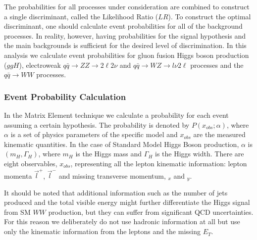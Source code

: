 The probabilities for all processes under consideration are combined 
to construct a single discriminant, called the Likelihood Ratio ($LR$).  
To construct the optimal discriminant, one should calculate 
event probabilities for all of the background processes. In reality, however, having 
probabilities for the signal hypothesis and the main backgrounds is sufficient for the 
desired level of discrimination. In this analysis we calculate event probabilities 
for gluon fusion Higgs boson production ($ggH$), electroweak $q\bar{q}\rightarrow ZZ\to 2\ell2\nu$ 
and $q\bar{q}\rightarrow WZ\to l\nu2\ell$ processes and the $q\bar{q}\rightarrow WW$ processes. 


\subsubsection{Event Probability Calculation}

In the Matrix Element technique we calculate a probability for each event assuming a
certain hypothesis.  The probability is denoted by $P(x_{obs};\alpha)$,
where $\alpha$ is a set of physics 
parameters of the specific model and $x_{obs}$ are the measured kinematic quantities.
In the case of Standard Model Higgs Boson production,
 $\alpha$ is $(m_H, \Gamma_H)$, where  $m_H$ is the Higgs mass 
and $\Gamma_H$ is the Higgs width. There are eight observables, $x_{obs}$, representing all the 
lepton kinematic information: lepton momenta $\vec{l}^+$, $\vec{l}^-$ and missing 
transverse momentum, \met$_x$ and \met$_y$.

It should be noted that additional information such as the number of jets
produced and the total visible energy might further differentiate the Higgs signal from SM
$WW$ production,
but they can suffer from significant  QCD uncertainties. For this reason we 
deliberately do not use hadronic information at all but use
only the kinematic information from the leptons and the missing $E_T$.


